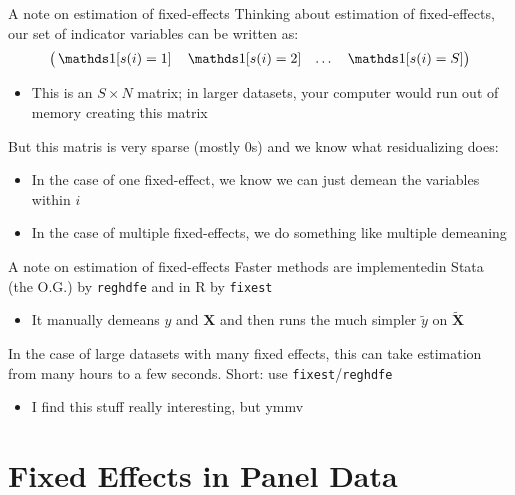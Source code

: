 \documentclass[aspectratio=169,t,11pt,table]{beamer}
\begin{document}
\begin{frame}{A note on estimation of fixed-effects}
  Thinking about estimation of fixed-effects, our set of indicator variables can be written as:
  $$
    \begin{pmatrix}
      \one{s(i) = 1} & \one{s(i) = 2} & \dots & \one{s(i) = S}
    \end{pmatrix}
  $$
  \begin{itemize}
    \item This is an $S \times N$ matrix; in larger datasets, your computer would run out of memory creating this matrix
  \end{itemize}

  \bigskip
  But this matris is very sparse (mostly 0s) and we know what residualizing does:
  \begin{itemize}
    \item In the case of one fixed-effect, we know we can just demean the variables within $i$ 
    
    \item In the case of multiple fixed-effects, we do something like multiple demeaning
  \end{itemize}
\end{frame}

\begin{frame}{A note on estimation of fixed-effects}
  Faster methods are implementedin Stata (the O.G.) by \texttt{reghdfe} and in R by \texttt{fixest}
  \begin{itemize}
    \item It manually demeans $y$ and $\bm{X}$ and then runs the much simpler $\tilde{y}$ on $\tilde{\bm{X}}$
  \end{itemize}

  \bigskip
  In the case of large datasets with many fixed effects, this can take estimation from many hours to a few seconds. Short: use \texttt{fixest}/\texttt{reghdfe}
  \begin{itemize}
    \item I find this stuff really interesting, but ymmv
  \end{itemize}
\end{frame}




\section{Fixed Effects in Panel Data}
\end{document}
